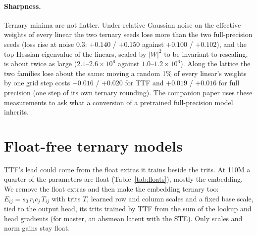 \documentclass[10pt,twocolumn]{article}
\begin{document}
\paragraph{Sharpness.} Ternary minima are not flatter. Under relative Gaussian noise on the effective weights of every
linear the two ternary seeds lose more than the two full-precision seeds (loss rise at noise 0.3: $+0.140$ / $+0.150$
against $+0.100$ / $+0.102$), and the top Hessian eigenvalue of the linears, scaled by $|W|^2$ to be invariant to
rescaling, is about twice as large ($2.1$--$2.6\times10^6$ against $1.0$--$1.2\times10^6$). Along the lattice the two
families lose about the same: moving a random 1\% of every linear's weights by one grid step costs $+0.016$ / $+0.020$
for TTF and $+0.019$ / $+0.016$ for full precision (one step of its own ternary rounding). The companion paper uses these
measurements to ask what a conversion of a pretrained full-precision model inherits.

\section{Float-free ternary models}\label{sec:floatfree}
TTF's lead could come from the float extras it trains beside the trits. At 110M a quarter of the parameters are float
(Table~\ref{tab:floats}), mostly the embedding. We remove the float extras and then make the embedding ternary too: $E_{ij}=s_0\,r_ic_j\,T_{ij}$ with trits $T$, learned row and column scales and
a fixed base scale, tied to the output head, its trits trained by TTF from the sum of the lookup and head gradients
(for master, an absmean latent with the STE). Only scales and norm gains stay float.
\begin{table}[t]
\centering
\caption{Float-free variants (110M, rank 512, final recipe; fixed windows). Master with all float extras is the
two-seed mean, without extras the three-seed mean.}
\label{tab:floatfree}
\end{table}
\end{document}
